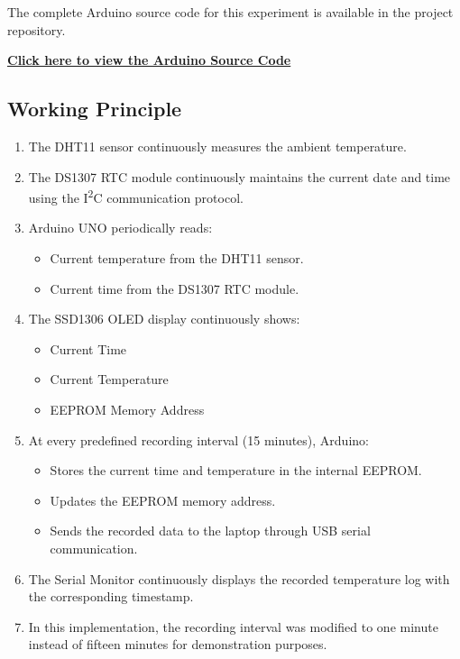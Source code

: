 The complete Arduino source code for this experiment is available in the project repository.

\href{https://github.com/YOUR_USERNAME/YOUR_REPOSITORY/blob/main/Exp-4/temp_recorder/file.ino}
{\textbf{Click here to view the Arduino Source Code}}


\subsection{Working Principle}

\begin{enumerate}

\item The DHT11 sensor continuously measures the ambient temperature.

\item The DS1307 RTC module continuously maintains the current date and time using the I\textsuperscript{2}C communication protocol.

\item Arduino UNO periodically reads:

\begin{itemize}
    \item Current temperature from the DHT11 sensor.
    \item Current time from the DS1307 RTC module.
\end{itemize}

\item The SSD1306 OLED display continuously shows:

\begin{itemize}
    \item Current Time
    \item Current Temperature
    \item EEPROM Memory Address
\end{itemize}

\item At every predefined recording interval (15 minutes), Arduino:

\begin{itemize}
    \item Stores the current time and temperature in the internal EEPROM.
    \item Updates the EEPROM memory address.
    \item Sends the recorded data to the laptop through USB serial communication.
\end{itemize}

\item The Serial Monitor continuously displays the recorded temperature log with the corresponding timestamp.

\item In this implementation, the recording interval was modified to one minute instead of fifteen minutes for demonstration purposes.

\end{enumerate}


